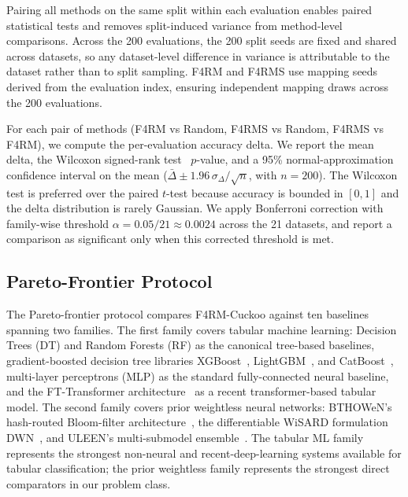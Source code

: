 Pairing all methods on the same split within each evaluation enables paired statistical tests and removes split-induced variance from method-level comparisons. Across the 200 evaluations, the 200 split seeds are fixed and shared across datasets, so any dataset-level difference in variance is attributable to the dataset rather than to split sampling. F4RM and F4RMS use mapping seeds derived from the evaluation index, ensuring independent mapping draws across the 200 evaluations.

For each pair of methods (F4RM vs Random, F4RMS vs Random, F4RMS vs F4RM), we compute the per-evaluation accuracy delta. We report the mean delta, the Wilcoxon signed-rank test~\cite{wilcoxon1945individual} $p$-value, and a 95\% normal-approximation confidence interval on the mean ($\bar{\Delta} \pm 1.96\, \sigma_{\Delta}/\sqrt{n}$, with $n = 200$). The Wilcoxon test is preferred over the paired $t$-test because accuracy is bounded in $[0, 1]$ and the delta distribution is rarely Gaussian. We apply Bonferroni correction with family-wise threshold $\alpha = 0.05/21 \approx 0.0024$ across the 21 datasets, and report a comparison as significant only when this corrected threshold is met.

\subsection{Pareto-Frontier Protocol}
\label{sec:method-pareto}

The Pareto-frontier protocol compares F4RM-Cuckoo against ten baselines spanning two families. The first family covers tabular machine learning: Decision Trees (DT) and Random Forests (RF) as the canonical tree-based baselines, gradient-boosted decision tree libraries XGBoost~\cite{chen2016xgboost}, LightGBM~\cite{ke2017lightgbm}, and CatBoost~\cite{prokhorenkova2018catboost}, multi-layer perceptrons (MLP) as the standard fully-connected neural baseline, and the FT-Transformer architecture~\cite{gorishniy2021fttransformer} as a recent transformer-based tabular model. The second family covers prior weightless neural networks: BTHOWeN's hash-routed Bloom-filter architecture~\cite{susskind2022bthowen}, the differentiable WiSARD formulation DWN~\cite{bacellar2024dwn}, and ULEEN's multi-submodel ensemble~\cite{susskind2023uleen}. The tabular ML family represents the strongest non-neural and recent-deep-learning systems available for tabular classification; the prior weightless family represents the strongest direct comparators in our problem class.


